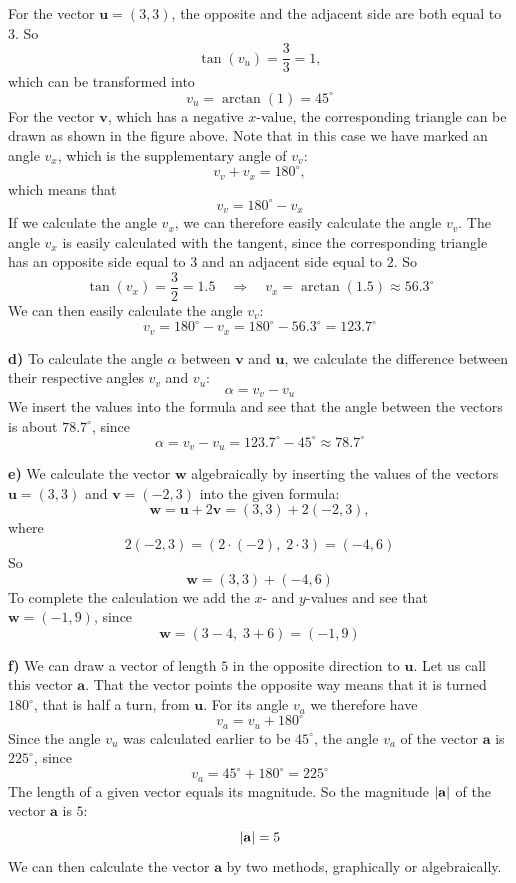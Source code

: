 \begin{exempel}
For the vector $\mathbf{u} = (3, 3)$, the opposite and the adjacent side are both equal to $3$.
So
\[
  \tan(v_u) = \frac{3}{3} = 1,
\]
which can be transformed into
\[
  v_u = \arctan(1) = 45^{\circ}
\]
For the vector $\mathbf{v}$, which has a negative $x$-value, the corresponding triangle can be
drawn as shown in the figure above. Note that in this case we have marked an angle $v_x$, which
is the supplementary angle of $v_v$:
\[
  v_v + v_x = 180^{\circ},
\]
which means that
\[
  v_v = 180^{\circ} - v_x
\]
If we calculate the angle $v_x$, we can therefore easily calculate the angle $v_v$. The angle
$v_x$ is easily calculated with the tangent, since the corresponding triangle has an opposite
side equal to $3$ and an adjacent side equal to $2$. So
\[
  \tan(v_x) = \frac{3}{2} = 1.5 \quad \Rightarrow \quad
  v_x = \arctan(1.5) \approx 56.3^{\circ}
\]
We can then easily calculate the angle $v_v$:
\[
  v_v = 180^{\circ} - v_x = 180^{\circ} - 56.3^{\circ} = 123.7^{\circ}
\]

\textbf{d)} To calculate the angle $\alpha$ between $\mathbf{v}$ and $\mathbf{u}$, we calculate
the difference between their respective angles $v_v$ and $v_u$:
\[
  \alpha = v_v - v_u
\]
We insert the values into the formula and see that the angle between the vectors is about
$78.7^{\circ}$, since
\[
  \alpha = v_v - v_u = 123.7^{\circ} - 45^{\circ} \approx 78.7^{\circ}
\]

\textbf{e)} We calculate the vector $\mathbf{w}$ algebraically by inserting the values of the
vectors $\mathbf{u} = (3, 3)$ and $\mathbf{v} = (-2, 3)$ into the given formula:
\[
  \mathbf{w} = \mathbf{u} + 2\mathbf{v} = (3, 3) + 2(-2, 3),
\]
where
\[
  2(-2, 3) = (2 \cdot (-2),\; 2 \cdot 3) = (-4, 6)
\]
So
\[
  \mathbf{w} = (3, 3) + (-4, 6)
\]
To complete the calculation we add the $x$- and $y$-values and see that
$\mathbf{w} = (-1, 9)$, since
\[
  \mathbf{w} = (3 - 4,\; 3 + 6) = (-1, 9)
\]

\textbf{f)} We can draw a vector of length $5$ in the opposite direction to $\mathbf{u}$. Let us
call this vector $\mathbf{a}$. That the vector points the opposite way means that it is turned
$180^{\circ}$, that is half a turn, from $\mathbf{u}$. For its angle $v_a$ we therefore have
\[
  v_a = v_u + 180^{\circ}
\]
Since the angle $v_u$ was calculated earlier to be $45^{\circ}$, the angle $v_a$ of the vector
$\mathbf{a}$ is $225^{\circ}$, since
\[
  v_a = 45^{\circ} + 180^{\circ} = 225^{\circ}
\]
The length of a given vector equals its magnitude. So the magnitude $\lvert\mathbf{a}\rvert$ of the
vector $\mathbf{a}$ is $5$:
\[
  \lvert\mathbf{a}\rvert = 5
\]
We can then calculate the vector $\mathbf{a}$ by two methods, graphically or algebraically.


\end{exempel}
